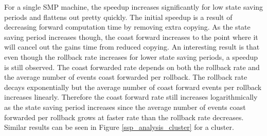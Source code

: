 \documentclass[11pt]{book}
\begin{document}
For a single SMP machine, the speedup increases significantly for low state saving periods and
flattens out pretty quickly.  The initial speedup is a result of decreasing forward computation
time by removing extra copying.  As the state saving period increases though, the coast forward 
increases to the point where it will cancel out the gains time from reduced copying.  An interesting
result is that even though the rollback rate increases for lower state saving periods, a speedup
is still observed.  The coast forwarded rate depends on both the rollback rate and the
average number of events coast forwarded per rollback.  The rollback rate decays exponentially
but the average number of coast forward events per rollback increases linearly.  Therefore the
coast forward rate still increases logarithmically as the state saving period increases since
the average number of events coast forwarded per rollback grows at faster rate than the rollback
rate decreases.  Similar results can be seen in Figure \ref{ssp_analysis_cluster} for a cluster.
\end{document}
